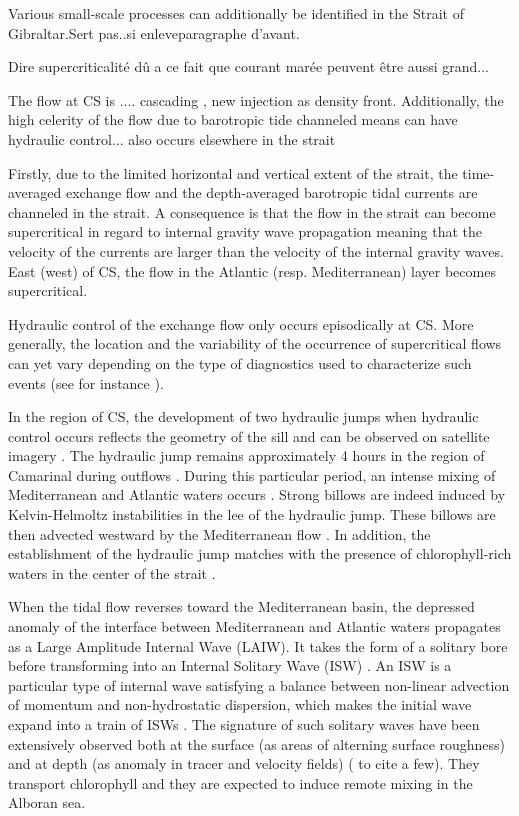 Various small-scale processes can additionally be identified in the Strait of Gibraltar.\color{red}Sert pas..si enleveparagraphe d'avant.\color{black}

\color{red}Dire supercriticalité dû a ce fait que courant marée peuvent être aussi grand...

The flow at CS is .... cascading , new injection as density front. Additionally, the high celerity of the flow due to barotropic tide channeled means can have hydraulic control... also occurs elsewhere in the strait\color{black}

Firstly, due to the limited horizontal and vertical extent of the strait, the time-averaged exchange flow and the depth-averaged barotropic tidal currents are channeled in the strait. A consequence is that the flow in the strait can become supercritical in regard to internal gravity wave propagation meaning that the velocity of the currents are larger than the velocity of the internal gravity waves.  East (west) of CS, the flow in the Atlantic (resp. Mediterranean) layer becomes supercritical.



Hydraulic control of the exchange flow only occurs episodically at CS. More generally, the location and the variability of the occurrence of supercritical flows can yet vary depending on the type of diagnostics used to characterize such events (see for instance \citet{armi_1988,vargas_2006,sannino_2007,sanchez-roman_2012}). 

In the region of CS, the development of two hydraulic jumps when hydraulic control occurs reflects the geometry of the sill and can be observed on satellite imagery \citep{brandt_1996}. The hydraulic jump remains approximately 4 hours in the region of Camarinal during outflows \citep{armi_1988,vlasenko_2009}. During this particular period, an intense mixing of Mediterranean and Atlantic waters occurs \citep{wesson_1994,macias_2006,garcia-lafuente_2011}. Strong billows are indeed induced by Kelvin-Helmoltz instabilities in the lee of the hydraulic jump. These billows are then advected westward by the Mediterranean flow \citep{wesson_1994}. In addition, the establishment of the hydraulic jump matches with the presence of chlorophyll-rich waters in the center of the strait \citep{bruno_2013}.

When the tidal flow reverses toward the Mediterranean basin, the depressed anomaly of the interface between Mediterranean and Atlantic waters propagates as a Large Amplitude Internal Wave (LAIW). It takes the form of a solitary bore before transforming into an Internal Solitary Wave (ISW) \citep{armi_1988}. An ISW is a particular type of internal wave satisfying a balance between non-linear advection of momentum and non-hydrostatic dispersion, which makes the initial wave expand into a train of ISWs \citep{vlasenko_2000}. The signature of such solitary waves have been extensively observed both at the surface (as areas of alterning surface roughness) and at depth (as anomaly in tracer and velocity fields) (\citet{ziegenbein_1970,armi_1988,watson_1990,sanchezgarrido_2008} to cite a few). They transport chlorophyll \citep{bruno_2013} and they are expected to induce remote mixing in the Alboran sea.

